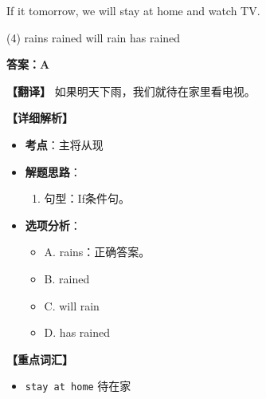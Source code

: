 \documentclass[11pt, a4paper]{article}
\newcommand{\analysis}[4]{
    \begin{solutionbox}
        \textbf{答案：#1}
        
        \textbf{【翻译】} #2
        
        \textbf{【详细解析】}
        #3
        
        \textbf{【重点词汇】}
        #4
    \end{solutionbox}
}
\newcommand{\blank}{\underline{\hspace{1.5cm}}}
\begin{document}
\begin{questions}
    \item If it \blank tomorrow, we will stay at home and watch TV.
    \begin{tasks}(4)
        \task rains \task rained \task will rain \task has rained
    \end{tasks}
    \analysis{A}{如果明天下雨，我们就待在家里看电视。}{
        \begin{itemize}
            \item \textbf{考点}：主将从现
            \item \textbf{解题思路}：
                \begin{enumerate}
                    \item 句型：If条件句。
                \end{enumerate}
            \item \textbf{选项分析}：
                \begin{itemize}
                    \item A. rains：正确答案。
                    \item B. rained
                    \item C. will rain
                    \item D. has rained
                \end{itemize}
        \end{itemize}
    }{
        \begin{itemize}
            \item \texttt{stay at home} 待在家
        \end{itemize}
    }


\end{questions}
\end{document}
